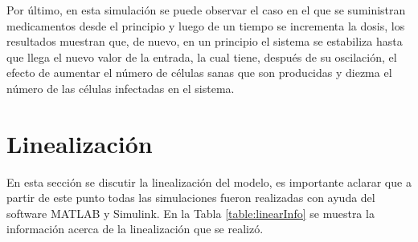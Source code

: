 \documentclass{article}
\begin{document}
Por último, en esta simulación se puede observar el caso en el que se
suministran medicamentos desde el principio y luego de un tiempo se incrementa
la dosis, los resultados muestran que, de nuevo, en un principio el sistema se
estabiliza hasta que llega el nuevo valor de la entrada, la cual
tiene, después de su oscilación, el efecto de aumentar el número de
células sanas que son producidas y diezma el número de las células infectadas
en el sistema.

\section{Linealización}

En esta sección se discutir la linealización del modelo, es importante aclarar
que a partir de este punto todas las simulaciones fueron realizadas con ayuda
del software MATLAB y Simulink. En la Tabla \ref{table:linearInfo} se muestra
la información acerca de la linealización que se realizó.
\end{document}
